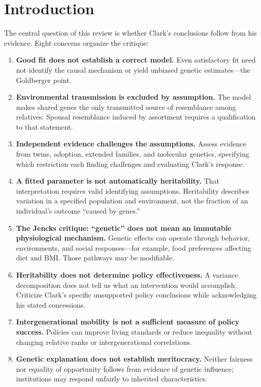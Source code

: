 \documentclass[12pt]{article}
\title{\makebox[\textwidth][l]{\parbox{\dimexpr\textwidth+0.5in\relax}{\raggedright Review of Gregory Clark: \emph{To Have and Have Not:}\\\emph{The Determinants of Social Status in England, 1600--2026}}}}
\author{David Cesarini}
\date{}
\begin{document}
\maketitle

\section{Introduction}

The central question of this review is whether Clark's conclusions follow
from his evidence. Eight concerns organize the critique:
\begin{enumerate}
\item \textbf{Good fit does not establish a correct model.}
Even satisfactory fit need not identify the causal mechanism or yield
unbiased genetic estimates---the Goldberger point.

\item \textbf{Environmental transmission is excluded by assumption.}
The model makes shared genes the only transmitted source of resemblance
among relatives. Spousal resemblance induced by assortment requires a
qualification to that statement.

\item \textbf{Independent evidence challenges the assumptions.}
Assess evidence from twins, adoption, extended families, and molecular
genetics, specifying which restriction each finding challenges and
evaluating Clark's response.

\item \textbf{A fitted parameter is not automatically heritability.}
That interpretation requires valid identifying assumptions. Heritability
describes variation in a specified population and environment, not the
fraction of an individual's outcome ``caused by genes.''

\item \textbf{The Jencks critique: ``genetic'' does not mean an immutable
physiological mechanism.}
Genetic effects can operate through behavior, environments, and social
responses---for example, food preferences affecting diet and BMI. Those
pathways may be modifiable.

\item \textbf{Heritability does not determine policy effectiveness.}
A variance decomposition does not tell us what an intervention would
accomplish. Criticize Clark's specific unsupported policy conclusions while
acknowledging his stated concessions.

\item \textbf{Intergenerational mobility is not a sufficient measure of
policy success.}
Policies can improve living standards or reduce inequality without
changing relative ranks or intergenerational correlations.

\item \textbf{Genetic explanation does not establish meritocracy.}
Neither fairness nor equality of opportunity follows from evidence of
genetic influence; institutions may respond unfairly to inherited
characteristics.
\end{enumerate}
\end{document}
